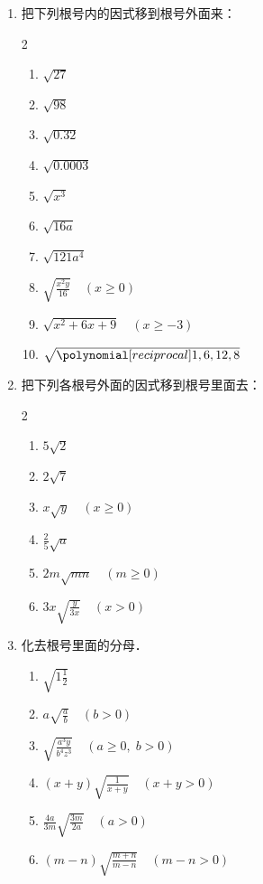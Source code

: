 \begin{ex}
\begin{enumerate}
    \item  把下列根号内的因式移到根号外面来：      
    \begin{multicols}{2}\begin{enumerate}
        \item $\sqrt{27}$
    \item $\sqrt{98}$
    \item $\sqrt{0.32}$
    \item $\sqrt{0.0003}$
    \item $\sqrt{x^3}$
    \item $\sqrt{16a}$
    \item $\sqrt{121a^4}$
    \item $\sqrt{\frac{x^2y}{16}}\quad (x\ge 0)$   
    \item $\sqrt{x^2+6x+9}\quad (x\ge -3)$
    \item $\sqrt{\poly{1,6,12,8}}$
\end{enumerate}    \end{multicols}
 
\item 把下列各根号外面的因式移到根号里面去：
\begin{multicols}{2}
    \begin{enumerate}
    \item $5\sqrt{2}$
    \item $2\sqrt{7}$
    \item $x\sqrt{y}\quad (x\ge 0)$
    \item $\frac{2}{5}\sqrt{a}$
    \item $2m\sqrt{mn}\quad (m\ge 0)$
    \item $3x\sqrt{\frac{y}{3x}}\quad (x>0)$
\end{enumerate}
\end{multicols}

\item 化去根号里面的分母．
\begin{enumerate}
    \item $\sqrt{1\frac{1}{2}}$
    \item $a\sqrt{\frac{a}{b}}\quad (b>0)$
    \item $\sqrt{\frac{a^3y}{b^4z^3}}\quad (a\ge 0,\; b>0)$
    \item $(x+y)\sqrt{\frac{1}{x+y}}\quad (x+y>0)$
    \item $\frac{4a}{3m}\sqrt{\frac{3m}{2a}}\quad (a>0)$
    \item $(m-n)\sqrt{\frac{m+n}{m-n}}\quad (m-n>0)$
\end{enumerate}
\end{enumerate}   
\end{ex}


